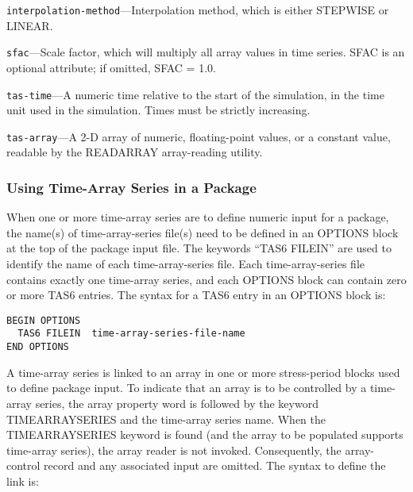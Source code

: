 \begin{description}
\item \texttt{interpolation-method}---Interpolation method, which is either STEPWISE or LINEAR.
\end{description}

\begin{description}
\item \texttt{sfac}---Scale factor, which will multiply all array values in time series. SFAC is an optional attribute; if omitted, SFAC = 1.0.
\end{description}

\begin{description}
\item \texttt{tas-time}---A numeric time relative to the start of the simulation, in the time unit used in the simulation. Times must be strictly increasing.
\end{description}

\begin{description}
\item \texttt{tas-array}---A 2-D array of numeric, floating-point values, or a constant value, readable by the READARRAY array-reading utility.
\end{description}

\subsubsection{Using Time-Array Series in a Package}
When one or more time-array series are to define numeric input for a package, the name(s) of time-array-series file(s) need to be defined in an OPTIONS block at the top of the package input file. The keywords ``TAS6 FILEIN'' are used to identify the name of each time-array-series file. Each time-array-series file contains exactly one time-array series, and each OPTIONS block can contain zero or more TAS6 entries. The syntax for a TAS6 entry in an OPTIONS block is:

\begin{lstlisting}[style=blockdefinition]
BEGIN OPTIONS
  TAS6 FILEIN  time-array-series-file-name
END OPTIONS
\end{lstlisting}

A time-array series is linked to an array in one or more stress-period blocks used to define package input. To indicate that an array is to be controlled by a time-array series, the array property word is followed by the keyword TIMEARRAYSERIES and the time-array series name. When the TIMEARRAYSERIES keyword is found (and the array to be populated supports time-array series), the array reader is not invoked. Consequently, the array-control record and any associated input are omitted. The syntax to define the link is:

